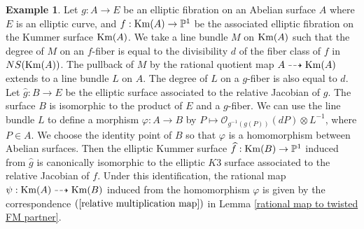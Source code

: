 \documentclass{article}
\theoremstyle{plain}
\theoremstyle{definition}
\newtheorem{example}[theorem]{Example}%
\theoremstyle{remark}
\newcommand{\proj}{{\mathbb P}}
\begin{document}
\begin{example}\label{example of multiplication map} 
Let $g : A \to E$ be an elliptic fibration on an Abelian surface $A$ where $E$ is an elliptic curve,  
and $f : {\rm Km\/} (A) \to {\proj}^{1}$ be the associated elliptic fibration on the Kummer surface ${\rm Km\/} (A)$.   
We take a line bundle $M$ on ${\rm Km\/} (A)$ such that 
the degree of $M$ on an $f$-fiber is equal to the divisibility $d$ of the fiber class of $f$ in $NS({\rm Km\/} (A))$.  
The pullback of $M$ by the rational quotient map $A \dashrightarrow {\rm Km\/} (A)$ extends to a line bundle $L$ on $A$.   
The degree of $L$ on a $g$-fiber is also equal to $d$.  
Let $\widehat{g} : B \to E$ be the elliptic surface associated to the relative Jacobian of $g$.  
The surface $B$ is isomorphic to the product of $E$ and a $g$-fiber.  
We can use the line bundle $L$ to define a morphism 
$\varphi : A \to B$ by $P \mapsto \mathcal{O}_{g^{-1}(g(P))}(dP)\otimes L^{-1}$,  
where $P \in A$.  
We choose the identity point of $B$ so that $\varphi $ is a homomorphism between Abelian surfaces. 
Then the elliptic Kummer surface  $\widehat{f} : {\rm Km\/} (B) \to {\proj}^{1}$ induced from $\widehat{g}$  
is canonically isomorphic to the elliptic $K3$ surface  associated to the relative Jacobian of $f$.  
Under this identification,  
the rational map $\psi : {\rm Km\/} (A) \dashrightarrow {\rm Km\/} (B)$ induced from the homomorphism $\varphi $ 
is given by the correspondence $(\ref{relative multiplication map})$ in Lemma \ref{rational map to twisted FM partner}.  




\end{example}
\end{document}

